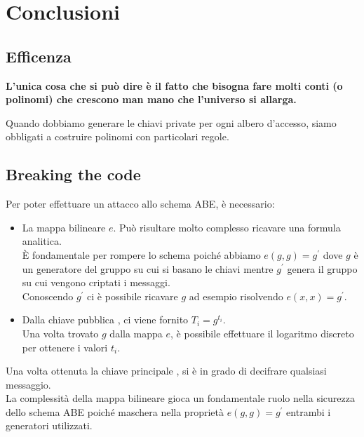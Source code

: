 \chapter{Conclusioni}



\section{Efficenza}

\textbf{L'unica cosa che si può dire è il fatto che bisogna fare molti conti (o polinomi) che crescono man mano che l'universo si allarga.}

Quando dobbiamo generare le chiavi private per ogni albero d'accesso, siamo obbligati a costruire polinomi con particolari regole.\\


\section{Breaking the code}

Per poter effettuare un attacco allo schema ABE, è necessario:

\begin{itemize}
	\item La mappa bilineare $e$. Può risultare molto complesso ricavare una formula analitica.\\ 
	È fondamentale per rompere lo schema poiché abbiamo $e(g,g) = g^\prime$ dove $g$ è un generatore del gruppo su cui si basano le chiavi mentre $g^\prime$ genera il gruppo su cui vengono criptati i messaggi.\\
	Conoscendo $g^\prime$ ci è possibile ricavare $g$ ad esempio risolvendo $e(x,x) = g^\prime$.
	\item Dalla chiave pubblica \pk, ci viene fornito $T_i = g^{t_i}$.\\
	Una volta trovato $g$ dalla mappa $e$, è possibile effettuare il logaritmo discreto per ottenere i valori $t_i$.
\end{itemize}

Una volta ottenuta la chiave principale \mk, si è in grado di decifrare qualsiasi messaggio.\\
La complessità della mappa bilineare gioca un fondamentale ruolo nella sicurezza dello schema ABE poiché maschera nella proprietà $e(g,g) = g^\prime$ entrambi i generatori utilizzati.


